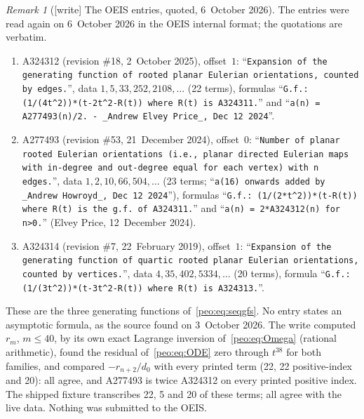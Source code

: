 \documentclass[11pt]{article}
\numberwithin{equation}{section}
\theoremstyle{remark}\newtheorem{remark}[theorem]{Remark}
\begin{document}
\begin{remark}[{[write]} The OEIS entries, quoted, 6~October 2026]\label{peo:rem:oeis}
The entries were read again on 6~October 2026 in the OEIS internal format;
the quotations are verbatim.
\begin{enumerate}[label=(\alph*)]\raggedright
\item A324312 (revision \#18, 2~October 2025), offset~$1$: ``\texttt{Expansion
 of the generating function of rooted planar Eulerian orientations, counted
 by edges.}'', data $1,5,33,252,2108,\dots$ (22 terms), formulas
 ``\texttt{G.f.: (1/(4t\^{}2))*(t-2t\^{}2-R(t)) where R(t) is A324311.}'' and
 ``\texttt{a(n) = A277493(n)/2. - \_Andrew Elvey Price\_, Dec 12 2024}''.
\item A277493 (revision \#53, 21~December 2024), offset~$0$: ``\texttt{Number
 of planar rooted Eulerian orientations (i.e., planar directed Eulerian maps
 with in-degree and out-degree equal for each vertex) with n edges.}'', data
 $1,2,10,66,504,\dots$ (23 terms; ``\texttt{a(16) onwards added by \_Andrew
 Howroyd\_, Dec 12 2024}''), formulas ``\texttt{G.f.: (1/(2*t\^{}2))*(t-R(t))
 where R(t) is the g.f. of A324311.}'' and ``\texttt{a(n) = 2*A324312(n) for
 n>0.}'' (Elvey Price, 12~December 2024).
\item A324314 (revision \#7, 22~February 2019), offset~$1$:
 ``\texttt{Expansion of the generating function of quartic rooted planar
 Eulerian orientations, counted by vertices.}'', data
 $4,35,402,5334,\dots$ (20 terms), formula ``\texttt{G.f.:
 (1/(3t\^{}2))*(t-3t\^{}2-R(t)) where R(t) is A324313.}''.
\end{enumerate}
These are the three generating functions of~\eqref{peo:eq:seqgfs}. No entry
states an asymptotic formula, as the source found on 3~October 2026. The
write computed $r_m$, $m\le40$, by its own exact Lagrange inversion
of~\eqref{peo:eq:Omega} (rational arithmetic), found the
residual of~\eqref{peo:eq:ODE} zero through $t^{38}$ for both families, and
compared $-r_{n+2}/d_0$ with every printed term (22, 22 positive-index and
20): all agree, and A277493 is twice A324312 on every printed positive
index. The shipped fixture transcribes 22, 5 and 20 of these terms; all
agree with the live data. Nothing was submitted to the OEIS.
\end{remark}
\end{document}
